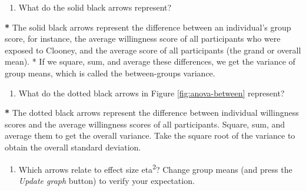 \documentclass[a4paper]{book}
\newenvironment{Shaded}{\begin{snugshade}}{\end{snugshade}}
\newcommand{\StringTok}[1]{\textcolor[rgb]{0.00,0.00,0.00}{#1}}
\newcommand{\OperatorTok}[1]{\textcolor[rgb]{0.00,0.00,0.00}{\textbf{#1}}}
\newcommand{\NormalTok}[1]{#1}
\providecommand{\tightlist}{%
  \setlength{\itemsep}{0pt}\setlength{\parskip}{0pt}}
\theoremstyle{definition}
\theoremstyle{definition}
\theoremstyle{definition}
\theoremstyle{remark}
\begin{document}
\begin{enumerate}
\def\labelenumi{\arabic{enumi}.}
\setcounter{enumi}{1}
\tightlist
\item
  What do the solid black arrows represent?
\end{enumerate}

\begin{Shaded}
\begin{Highlighting}[]
\OperatorTok{*}\StringTok{ }\NormalTok{The solid black arrows represent the difference between an individual}\StringTok{'s group}
\StringTok{score, for instance, the average willingness score of all participants who were}
\StringTok{exposed to Clooney, and the average score of all participants (the grand or}
\StringTok{overall mean).}
\StringTok{* If we square, sum, and average these differences, we get the variance of}
\StringTok{group means, which is called the between-groups variance.}
\end{Highlighting}
\end{Shaded}

\begin{enumerate}
\def\labelenumi{\arabic{enumi}.}
\setcounter{enumi}{2}
\tightlist
\item
  What do the dotted black arrows in Figure \ref{fig:anova-between}
  represent?
\end{enumerate}

\begin{Shaded}
\begin{Highlighting}[]
\OperatorTok{*}\StringTok{ }\NormalTok{The dotted black arrows represent the difference between individual}
\NormalTok{willingness scores and the average willingness scores of all participants.}
\NormalTok{Square, sum, and average them to get the overall variance. Take the square}
\NormalTok{root of the variance to obtain the overall standard deviation.}
\end{Highlighting}
\end{Shaded}

\begin{enumerate}
\def\labelenumi{\arabic{enumi}.}
\setcounter{enumi}{3}
\tightlist
\item
  Which arrows relate to effect size eta\textsuperscript{2}? Change
  group means (and press the \emph{Update graph} button) to verify your
  expectation.
\end{enumerate}
\end{document}
